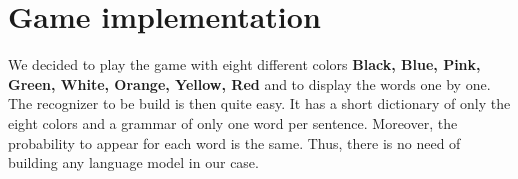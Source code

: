 \section*{Game implementation}
We decided to play the game with eight different colors \textbf{Black, Blue, Pink, Green, White, Orange, Yellow, Red} and to display the words one by one. The recognizer to be build is then quite easy. It has a short dictionary of only the eight colors and a grammar of only one word per sentence. Moreover, the probability to appear for each word is the same. Thus, there is no need of building any language model in our case.

\newpage
